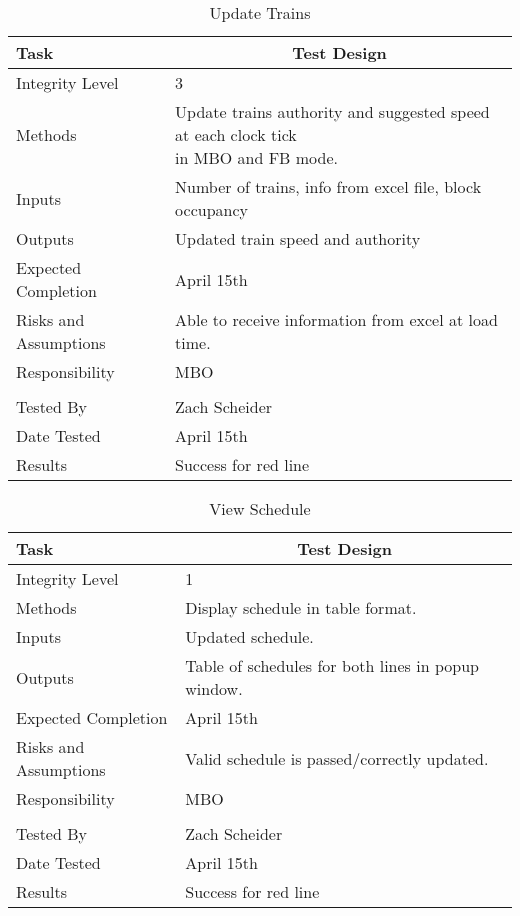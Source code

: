 \documentclass[]{article}
\begin{document}
\begin{table}[H]
	\centering
	\caption{Update Trains}
	\begin{tabular}{|l|l|}
		\hline
		Task & \multicolumn{1}{c|}{Test Design} \\ \hline
		Integrity Level & 3 \\ \hline
		Methods & \parbox[t]{10cm} {Update trains authority and suggested speed at each clock tick \\in MBO and FB mode.} \\ \hline
		Inputs &  Number of trains, info from excel file, block occupancy \\ \hline
		Outputs &  Updated train speed and authority \\ \hline
		Expected Completion & \parbox[t]{10cm}{April 15th}\\ \hline
		Risks and Assumptions & \parbox[t]{10cm}{Able to receive information from excel at load time.} \\ \hline
		Responsibility & MBO\\ \hline
			\\ \hline
		Tested By   &  Zach Scheider\\	\hline
		Date Tested & \parbox[t]{10cm}{April 15th}\\ \hline
		Results & Success for red line\\ \hline
	\end{tabular}
\end{table}

\begin{table}[H]
	\centering
	\caption{View Schedule}
	\begin{tabular}{|l|l|}
		\hline
		Task & \multicolumn{1}{c|}{Test Design} \\ \hline
		Integrity Level & 1 \\ \hline
		Methods & Display schedule in table format.\\ \hline
		Inputs &  Updated schedule. \\ \hline
		Outputs &  Table of schedules for both lines in popup window. \\ \hline
		Expected Completion & \parbox[t]{10cm}{April 15th}\\ \hline
		Risks and Assumptions & \parbox[t]{10cm}{Valid schedule is passed/correctly updated.} \\ \hline
		Responsibility & MBO\\ \hline
			\\ \hline
		Tested By   &  Zach Scheider\\	\hline
		Date Tested & \parbox[t]{10cm}{April 15th}\\ \hline
		Results & Success for red line\\ \hline
	\end{tabular}
\end{table}
\end{document}
